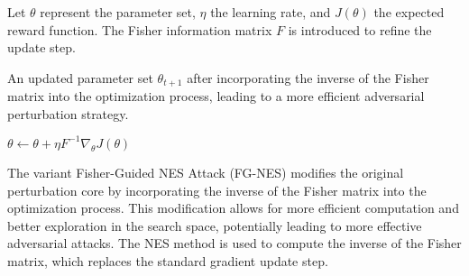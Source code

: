 Let $\theta$ represent the parameter set, $\eta$ the learning rate, and $J(\theta)$ the expected reward function. The Fisher information matrix $F$ is introduced to refine the update step.

An updated parameter set $\theta_{t+1}$ after incorporating the inverse of the Fisher matrix into the optimization process, leading to a more efficient adversarial perturbation strategy.

$\theta \leftarrow \theta + \eta F^{-1} \nabla_\theta J(\theta)$

The variant Fisher-Guided NES Attack (FG-NES) modifies the original perturbation core by incorporating the inverse of the Fisher matrix into the optimization process. This modification allows for more efficient computation and better exploration in the search space, potentially leading to more effective adversarial attacks. The NES method is used to compute the inverse of the Fisher matrix, which replaces the standard gradient update step.